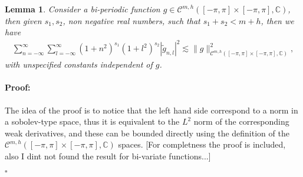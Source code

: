 \documentclass{article}
\newtheorem{lemma}[theorem]{Lemma}
\newenvironment{proof}{\paragraph{Proof:}}{\hfill$\square$}
\newcommand{\todo}[1]{{\color{red}[#1]}}
\newcommand{\IC}{{\mathbb C}}
\newcommand{\cmspaceh}[4]{\mathcal{C}^{#1,#2} \left( #3, #4 \right)}
\begin{document}
\begin{lemma}
\label{lemma:cmdecay2}
Consider a bi-periodic function $g \in \cmspaceh{m}{h}{[-\pi,\pi]\times[-\pi,\pi]}{\IC}$, then given $s_1, s_2$, non negative real numbers, such that $s_1+s_2 < m+h$, then we have 
\begin{align*}
\sum_{n=-\infty}^{\infty}\sum_{l=-\infty}^{\infty}
(1+n^2)^{s_1} (1+l^2)^{s_2} |\widetilde{g}_{n,l}|^2 \lesssim \|g\|^2_{\cmspaceh{m}{h}{[-\pi,\pi]\times[-\pi,\pi]}{\IC}},
\end{align*}
with unspecified constants independent of $g$. 
\end{lemma}
\begin{proof}
The idea of the proof is to notice that the left hand side correspond to a norm in a sobolev-type space, thus it is equivalent to the $L^2$ norm of the corresponding weak derivatives, and these can be bounded directly using the definition of the $\cmspaceh{m}{h}{[-\pi,\pi]\times[-\pi,\pi]}{\IC}$ spaces. \todo{For completness the proof is included, also I dint not found the result for bi-variate functions...}


\end{proof}
\end{document}
